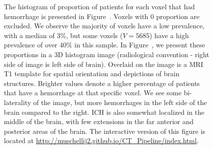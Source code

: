 \documentclass[10pt]{article}\usepackage[]{graphicx}\usepackage[]{color}
\begin{document}
\begin{figure}[H]
\centering

\caption{The histogram of proportion of patients for each voxel that had hemorrhage is presented in Figure~\protect{}. Voxels with 0 proportion are excluded.  We observe the majority of voxels have a low prevalence, with a median of 3\%, but some voxels ($V = 5685$) have a high prevalence of over 40\% in this sample.  In Figure~\protect{}, we present these proportions in a 3D histogram image (radiological convention - right side of image is left side of brain).  Overlaid on the image is a MRI T1 template for spatial orientation and depictions of brain structures.  Brighter values denote a higher percentage of patients that have a hemorrhage at that specific voxel. We see some bi-laterality of the image, but more hemorrhages in the left side of the brain compared to the right.  ICH is also somewhat localized in the middle of the brain, with few extensions in the far anterior and posterior areas of the brain.   The interactive version of this figure is located at \url{http://muschellij2.github.io/CT_Pipeline/index.html}.}
  \label{fig:StrokeHist}
\end{figure}
\end{document}
